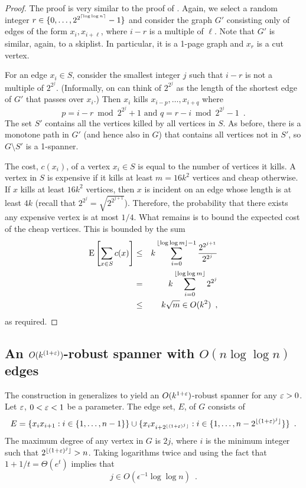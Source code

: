\documentclass{patmorin}
\begin{document}
\begin{proof}
The proof is very similar to the proof of .
Again, we select a random integer $r\in\{0,\ldots,2^{2^{{\lceil \log\log
n \rceil}}}-1\}$ and consider the graph $G'$ consisting only of edges of the
form $x_i,x_{i+\ell}$, where $i-r$ is a multiple of $\ell$.  Note that
$G'$ is similar, again, to a skiplist.  In particular, it is a 1-page
graph and $x_r$ is a cut vertex.

For an edge $x_i\in S$, consider the smallest integer $j$ such that
$i-r$ is not a multiple of $2^{2^{j}}$.  (Informally, on can think
of $2^{2^{j}}$ as the length of the shortest edge of $G'$ that passes
over $x_i$.)  Then $x_i$ kills $x_{i-p},\ldots,x_{i+q}$ where
\[
   p= i-r \bmod 2^{2^j}+1 \text{ and } 
   q= r-i \bmod 2^{2^j}-1 \enspace .
\]
The set $S'$ contains all the vertices killed by all vertices in $S$.
As before, there is a monotone path in $G'$ (and hence also in $G$)
that contains all vertices not in $S'$, so $G\setminus S'$ is a 1-spanner.

The cost, $c(x_i)$, of a vertex $x_i\in S$ is equal to the number of
vertices it kills.  A vertex in $S$ is expensive if it kills at least
$m=16k^{2}$ vertices and cheap otherwise.  If $x$ kills at least $16k^2$
vertices, then $x$ is incident on an edge whose length is at least $4k$
(recall that $2^{2^j}=\sqrt{2^{2^{j+1}}}$).  Therefore, the probability
that there exists any expensive vertex is at most $1/4$.  What remains
is to bound the expected cost of the cheap vertices.  This is bounded
by the sum
\begin{eqnarray*}
  \mathrm{E}\left[\sum_{x\in S} c(x)\right] 
    & \le & k\sum_{i=0}^{\lfloor\log\log m\rfloor-1}\frac{2^{2^{j+1}}}{2^{2^{j}}} \\  
    & = & k\sum_{i=0}^{\lfloor \log\log m \rfloor}2^{2^j} \\
    & \le & k\sqrt{m} \in O(k^2) \enspace ,
\end{eqnarray*}
as required.
\end{proof}

\subsection{An $O(k^{(1+\varepsilon)})$-robust spanner with $O(n\log\log n)$ edges}

The construction in  generalizes to yield an
$O(k^{1+\varepsilon})$-robust spanner for any $\varepsilon>0$.  Let $\varepsilon$, $0<\varepsilon<1$
be a parameter.  The edge set, $E$, of $G$ consists of
\[
  E =  \{x_ix_{i+1} : i\in\{1,\ldots,n-1\}\} 
      \cup \{x_ix_{i+2^{{\lfloor (1+\varepsilon)^j \rfloor}}} : 
               i\in\{1,\ldots,n-2^{{\lfloor (1+\varepsilon)^j \rfloor}}\} \} \\
    \enspace .
\]
The maximum degree of any vertex in $G$ is $2j$, where $i$ is the minimum
integer such that $2^{{\lfloor (1+\varepsilon)^j \rfloor}} > n$.  Taking logarithms twice
and using the fact that $1+1/t = \Theta(e^t)$ implies that
\[
    j \in O(\epsilon^{-1}\log\log n) \enspace .
\]
\end{document}
